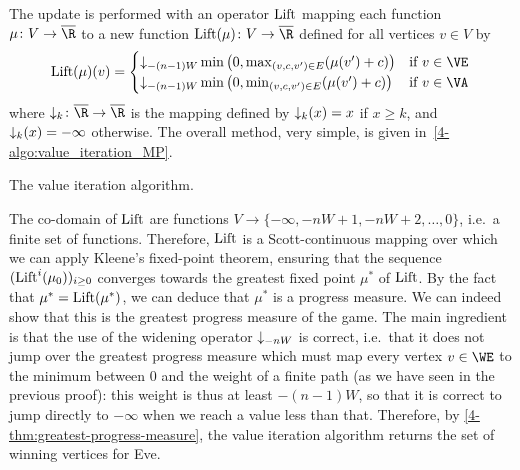 The update is performed with an operator $\textrm{Lift}$ mapping each function
$\mu\colon V\to \Rbar$ to a new function $\Lift(\mu)\colon V\to \Rbar$
defined for all vertices $v\in V$ by
\[\Lift(\mu)(v) =
  \begin{cases}
    \downward{-(n-1)W}\min\big(0,\max_{(v,c,v')\in E} (\mu(v')+c)\big) & \text{if } v\in
    \VE\\
    \downward{-(n-1)W}\min\big(0,\min_{(v,c,v')\in E} (\mu(v')+c)\big) & \text{if } v\in \VA
  \end{cases}\] where $\downward{k}\colon \Rbar\to \Rbar$ is the
mapping defined by $\mathop{\downarrow_{k}}(x) = x$ if $x\geq k$, and
$\mathop{\downarrow_{k}}(x) = -\infty$ otherwise. The overall method, very
simple, is given in~\cref{4-algo:value_iteration_MP}. 


\begin{algorithm}

     
\lRepeat{$\mu = \Lift(\mu)$}{
$\mu \leftarrow \Lift(\mu)$}

\caption{The value iteration algorithm.}
\label{4-algo:value_iteration_MP}
\end{algorithm}


The co-domain of $\textrm{Lift}$ are functions
$V\to \{-\infty,-nW+1,-nW+2,\ldots,0\}$, i.e.~a finite set of
functions. Therefore, $\textrm{Lift}$ is a Scott-continuous mapping over which
we can apply Kleene's fixed-point theorem, ensuring that the sequence
$(\textrm{Lift}^i(\mu_0))_{i\geq 0}$ converges towards the greatest fixed
point $\mu^*$ of $\textrm{Lift}$. By the fact that $\mu^*=\textrm{Lift}(\mu^*)$, we
can deduce that $\mu^*$ is a progress measure. We can indeed show that
this is the greatest progress measure of the game. The main ingredient
is that the use of the widening operator $\mathop{\downarrow_{-nW}}$ is
correct, i.e.~that it does not jump over the greatest progress measure
which must map every vertex $v\in\WE$ to the minimum between $0$ and
the weight of a finite path (as we have seen in the previous proof):
this weight is thus at least $-(n-1)W$, so that it is correct to
jump directly to $-\infty$ when we reach a value less than
that. Therefore, by \cref{4-thm:greatest-progress-measure}, the value
iteration algorithm returns the set of winning vertices for Eve.

